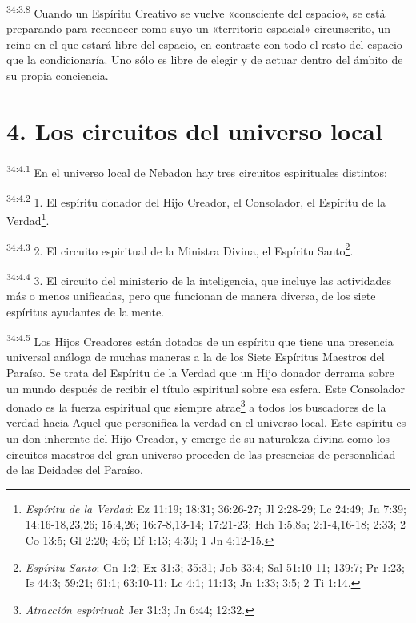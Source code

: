 \par
\textsuperscript{34:3.8} Cuando un Espíritu Creativo se vuelve «consciente del espacio», se está preparando para reconocer como suyo un «territorio espacial» circunscrito, un reino en el que estará libre del espacio, en contraste con todo el resto del espacio que la condicionaría. Uno sólo es libre de elegir y de actuar dentro del ámbito de su propia conciencia.

\section*{4. Los circuitos del universo local}
\par
\textsuperscript{34:4.1} En el universo local de Nebadon hay tres circuitos espirituales distintos:

\par
\textsuperscript{34:4.2} 1. El espíritu donador del Hijo Creador, el Consolador, el Espíritu de la Verdad\footnote{\textit{Espíritu de la Verdad}: Ez 11:19; 18:31; 36:26-27; Jl 2:28-29; Lc 24:49; Jn 7:39; 14:16-18,23,26; 15:4,26; 16:7-8,13-14; 17:21-23; Hch 1:5,8a; 2:1-4,16-18; 2:33; 2 Co 13:5; Gl 2:20; 4:6; Ef 1:13; 4:30; 1 Jn 4:12-15.}.

\par
\textsuperscript{34:4.3} 2. El circuito espiritual de la Ministra Divina, el Espíritu Santo\footnote{\textit{Espíritu Santo}: Gn 1:2; Ex 31:3; 35:31; Job 33:4; Sal 51:10-11; 139:7; Pr 1:23; Is 44:3; 59:21; 61:1; 63:10-11; Lc 4:1; 11:13; Jn 1:33; 3:5; 2 Ti 1:14.}.

\par
\textsuperscript{34:4.4} 3. El circuito del ministerio de la inteligencia, que incluye las actividades más o menos unificadas, pero que funcionan de manera diversa, de los siete espíritus ayudantes de la mente.

\par
\textsuperscript{34:4.5} Los Hijos Creadores están dotados de un espíritu que tiene una presencia universal análoga de muchas maneras a la de los Siete Espíritus Maestros del Paraíso. Se trata del Espíritu de la Verdad que un Hijo donador derrama sobre un mundo después de recibir el título espiritual sobre esa esfera. Este Consolador donado es la fuerza espiritual que siempre atrae\footnote{\textit{Atracción espiritual}: Jer 31:3; Jn 6:44; 12:32.} a todos los buscadores de la verdad hacia Aquel que personifica la verdad en el universo local. Este espíritu es un don inherente del Hijo Creador, y emerge de su naturaleza divina como los circuitos maestros del gran universo proceden de las presencias de personalidad de las Deidades del Paraíso.

